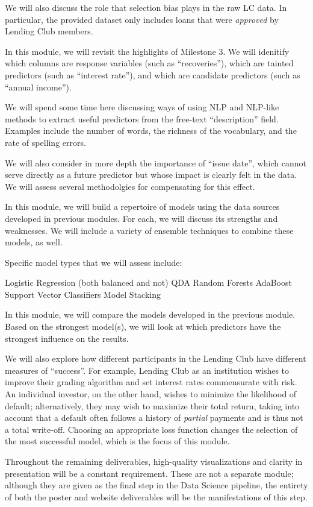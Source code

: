 We will also discuss the role that selection bias plays in the raw LC data. In particular, the provided dataset only includes loans that were {\it approved} by Lending Club members.

In this module, we will revisit the highlights of Milestone 3. We will idenitify which columns are response variables (such as ``recoveries''), which are tainted predictors (such as ``interest rate''), and which are candidate predictors (such as ``annual income'').

We will spend some time here discussing ways of using NLP and NLP-like methods to extract useful predictors from the free-text ``description'' field. Examples include the number of words, the richness of the vocabulary, and the rate of spelling errors.

We will also consider in more depth the importance of ``issue date'', which cannot serve directly as a future predictor but whose impact is clearly felt in the data. We will assess several methodolgies for compensating for this effect.

In this module, we will build a repertoire of models using the data sources developed in previous modules. For each, we will discuss its strengths and weaknesses. We will include a variety of ensemble techniques to combine these models, as well.

Specific model types that we will assess include:

\* Logistic Regression (both balanced and not)
\* QDA
\* Random Forests
\* AdaBoost
\* Support Vector Classifiers
\* Model Stacking

In this module, we will compare the models developed in the previous module. Based on the strongest model(s), we will look at which predictors have the strongest influence on the results.

We will also explore how different participants in the Lending Club have different measures of ``success''. For example, Lending Club as an institution wishes to improve their grading algorithm and set interest rates commensurate with risk. An individual investor, on the other hand, wishes to minimize the likelihood of default; alternatively, they may wish to maximize their total return, taking into account that a default often follows a history of {\it partial} payments and is thus not a total write-off. Choosing an appropriate loss function changes the selection of the most successful model, which is the focus of this module.

Throughout the remaining deliverables, high-quality visualizations and clarity in presentation will be a constant requirement. These are not a separate module; although they are given as the final step in the Data Science pipeline, the entirety of both the poster and website deliverables will be the manifestations of this step.

\bye

